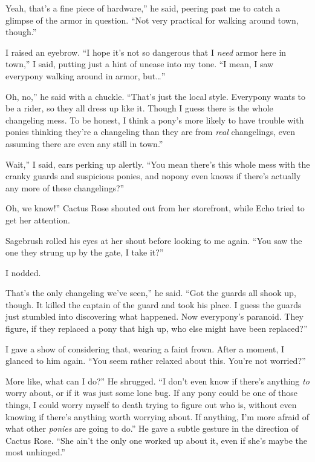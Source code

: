 \leavevmode{}Yeah, that’s a fine piece of hardware,” he said, peering past me to catch a glimpse of the armor in question. “Not very practical for walking around town, though.”

I raised an eyebrow. “I hope it’s not so dangerous that I \textit{need} armor here in town,” I said, putting just a hint of unease into my tone. “I mean, I saw everypony walking around in armor, but…”

\leavevmode{}Oh, no,” he said with a chuckle. “That’s just the local style. Everypony wants to be a rider, so they all dress up like it. Though I guess there is the whole changeling mess. To be honest, I think a pony’s more likely to have trouble with ponies thinking they’re a changeling than they are from \textit{real} changelings, even assuming there are even any still in town.”

\leavevmode{}Wait,” I said, ears perking up alertly. “You mean there’s this whole mess with the cranky guards and suspicious ponies, and nopony even knows if there’s actually any more of these changelings?”

\leavevmode{}Oh, we know!” Cactus Rose shouted out from her storefront, while Echo tried to get her attention.

Sagebrush rolled his eyes at her shout before looking to me again. “You saw the one they strung up by the gate, I take it?”

I nodded.

\leavevmode{}That’s the only changeling we’ve seen,” he said. “Got the guards all shook up, though. It killed the captain of the guard and took his place. I guess the guards just stumbled into discovering what happened. Now everypony’s paranoid. They figure, if they replaced a pony that high up, who else might have been replaced?”

I gave a show of considering that, wearing a faint frown. After a moment, I glanced to him again. “You seem rather relaxed about this. You’re not worried?”

\leavevmode{}More like, what can I do?” He shrugged. “I don’t even know if there’s anything \textit{to} worry about, or if it was just some lone bug. If any pony could be one of those things, I could worry myself to death trying to figure out who is, without even knowing if there’s anything worth worrying about. If anything, I’m more afraid of what other \textit{ponies} are going to do.” He gave a subtle gesture in the direction of Cactus Rose. “She ain’t the only one worked up about it, even if she’s maybe the most unhinged.”

